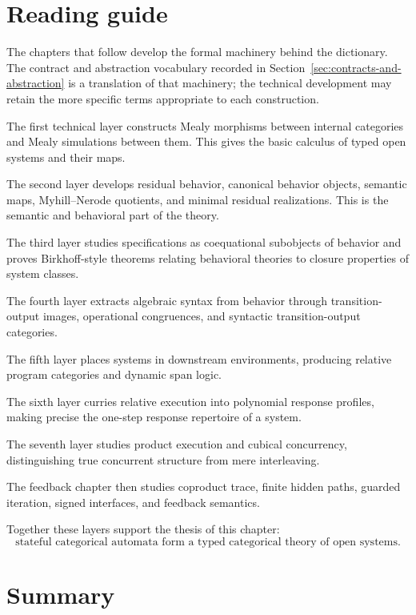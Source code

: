 \section{Reading guide}
\label{sec:systems-reading-guide}

The chapters that follow develop the formal machinery behind the dictionary.
The contract and abstraction vocabulary recorded in
Section~\ref{sec:contracts-and-abstraction} is a translation of that machinery;
the technical development may retain the more specific terms appropriate to
each construction.

The first technical layer constructs Mealy morphisms between internal
categories and Mealy simulations between them.  This gives the basic calculus
of typed open systems and their maps.

The second layer develops residual behavior, canonical behavior objects,
semantic maps, Myhill--Nerode quotients, and minimal residual realizations.
This is the semantic and behavioral part of the theory.

The third layer studies specifications as coequational subobjects of behavior
and proves Birkhoff-style theorems relating behavioral theories to closure
properties of system classes.

The fourth layer extracts algebraic syntax from behavior through
transition-output images, operational congruences, and syntactic
transition-output categories.

The fifth layer places systems in downstream environments, producing relative
program categories and dynamic span logic.

The sixth layer curries relative execution into polynomial response profiles,
making precise the one-step response repertoire of a system.

The seventh layer studies product execution and cubical concurrency,
distinguishing true concurrent structure from mere interleaving.

The feedback chapter then studies coproduct trace, finite hidden paths,
guarded iteration, signed interfaces, and feedback semantics.

Together these layers support the thesis of this chapter:
\[
  \boxed{
  \text{stateful categorical automata form a typed categorical theory of
  open systems.}
  }
\]

\section{Summary}
\label{sec:systems-summary}

